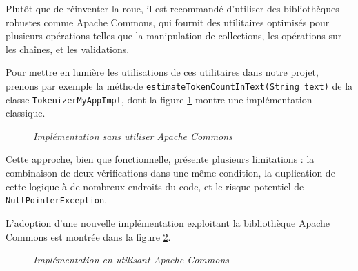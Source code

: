 \documentclass[12pt,a4paper]{report}
\begin{document}
	Plutôt que de réinventer la roue, il est recommandé d’utiliser des bibliothèques robustes comme Apache Commons, qui fournit des utilitaires optimisés pour plusieurs opérations telles que la manipulation de collections, les opérations sur les chaînes, et les validations.
	
	Pour mettre en lumière les utilisations de ces utilitaires dans notre projet, prenons par exemple la méthode \verb|estimateTokenCountInText(String text)| de la classe \verb|TokenizerMyAppImpl|, dont la figure \ref{fig:before-string-utils} montre une implémentation classique.
	
	\begin{figure}[H]
		\centering
		\caption{\textit{Implémentation sans utiliser Apache Commons}}
		\label{fig:before-string-utils}
	\end{figure}
	
	Cette approche, bien que fonctionnelle, présente plusieurs limitations : la combinaison de deux vérifications dans une même condition, la duplication de cette logique à de nombreux endroits du code, et le risque potentiel de \verb|NullPointerException|.
	
	L'adoption d'une nouvelle implémentation exploitant la bibliothèque Apache Commons est montrée dans la figure \ref{fig:after-string-utils}.
	
	\begin{figure}[H]
		\centering
		\caption{\textit{Implémentation en utilisant Apache Commons}}
		\label{fig:after-string-utils}
	\end{figure}
	
\end{document}
